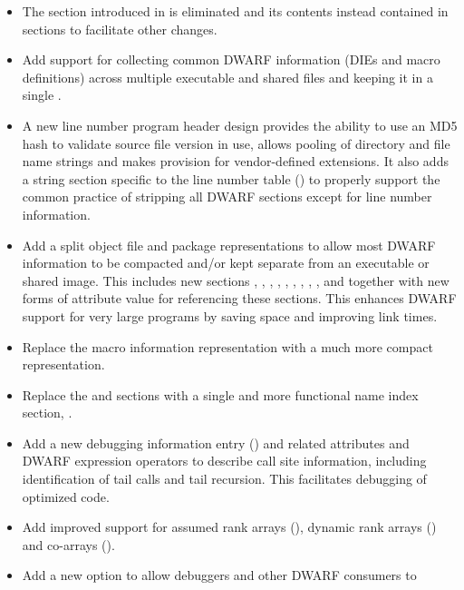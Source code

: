\begin{itemize}
\item The \dotdebugtypes{}
section introduced in \DWARFVersionIV{} 
is eliminated and its contents instead contained in \dotdebuginfo{} sections
to facilitate other changes.
\item Add support for collecting common DWARF information (DIEs and macro definitions)
across multiple executable and shared files and keeping it in a single
.
\item A new line number program header design provides the ability to 
use an MD5 hash to validate source file version in use, allows pooling 
of directory and file name strings and makes provision for vendor-defined
extensions. It also adds a string section specific to the line number table 
(\dotdebuglinestr)
to properly support the common practice of stripping all DWARF sections
except for line number information.
\item Add a split object file and package representations to allow most 
DWARF information to be compacted and/or kept separate from an executable 
or shared image. This includes new sections 
\dotdebugaddr, \dotdebugstroffsets, \dotdebugabbrevdwo, \dotdebuginfodwo, 
\dotdebuglinedwo, \dotdebuglocdwo, \dotdebugmacrodwo, \dotdebugstrdwo,
\dotdebugstroffsetsdwo, \dotdebugcuindex{} and \dotdebugtuindex{} 
together with new forms of attribute value for referencing these sections.
This enhances DWARF support for very large programs by saving space 
and improving link times.
\item Replace the \dotdebugmacinfo{} macro information representation with
a much more compact \dotdebugmacro{} representation.
\item Replace the \dotdebugpubnames{} and \dotdebugtypes{} sections
with a single and more functional name index section, \dotdebugnames{}.
\item Add a new debugging information entry (\DWTAGcallsiteNAME) and related 
attributes and DWARF expression operators to describe call site information, 
including identification of tail calls and tail recursion.
This facilitates debugging of optimized code.
\item Add improved support for  assumed rank arrays 
(\DWTAGgenericsubrangeNAME), dynamic rank arrays (\DWATrankNAME)
and co-arrays (\DWTAGcoarraytypeNAME{}).
\item Add a new option to allow debuggers and other DWARF consumers to

\end{itemize}
